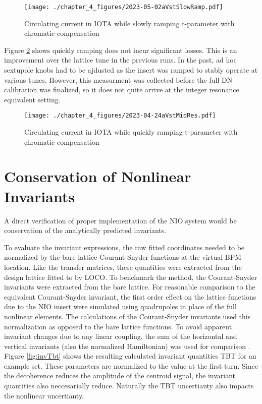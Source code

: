 \begin{figure}
	\centering
	\texttt{[image: ./chapter\_4\_figures/2023-05-02aVstSlowRamp.pdf]}
	\caption{Circulating current in IOTA while slowly ramping t-parameter with chromatic compensation}
	\label{fig:slowRamp}
\end{figure}

Figure \ref{fig:fastRamp} shows quickly ramping does not incur significant losses. This is an improvement over the lattice tune in the previous runs. In the past, ad hoc sextupole knobs had to be ajdusted as the insert was ramped to stably operate at various tunes. However, this measurment was collected before the full DN calibration was finalized, so it does not quite arrive at the integer resonance equivalent setting.

\begin{figure}
	\centering
	\texttt{[image: ./chapter\_4\_figures/2023-04-24aVstMidRes.pdf]}
	\caption{Circulating current in IOTA while quickly ramping t-parameter with chromatic compensation}
	\label{fig:fastRamp}
\end{figure}


\section{Conservation of Nonlinear Invariants} \label{sec:invConv}
A direct verification of proper implementation of the NIO system would be conservation of the analytically predicted invariants.

To evaluate the invariant expressions, the raw fitted coordinates needed to be normalized by the bare lattice Courant-Snyder functions at the virtual BPM location. Like the transfer matrices, these quantities were extracted from the design lattice fitted to by LOCO. To benchmark the method, the Courant-Snyder invariants were extracted from the bare lattice. For reasonable comparison to the equivalent Courant-Snyder invariant, the first order effect on the lattice functions due to the NIO insert were simulated using quadrupoles in place of the full nonlinear elements. The calculations of the Courant-Snyder invariants used this normalization as opposed to the bare lattice functions. To avoid apparent invariant changes due to any linear coupling, the sum of the horizontal and vertical invariants (also the normalized Hamiltonian) was used for comparison \cite{leeAccelerator}.  Figure \ref{fig:invTbt} shows the resulting calculated invariant quantities TBT for an example set. These parameters are normalized to the value at the first turn. Since the decoherence reduces the amplitude of the centroid signal, the invariant quantities also neccesarially reduce. Naturally the TBT uncertianty also impacts the nonlinear uncertianty. 

